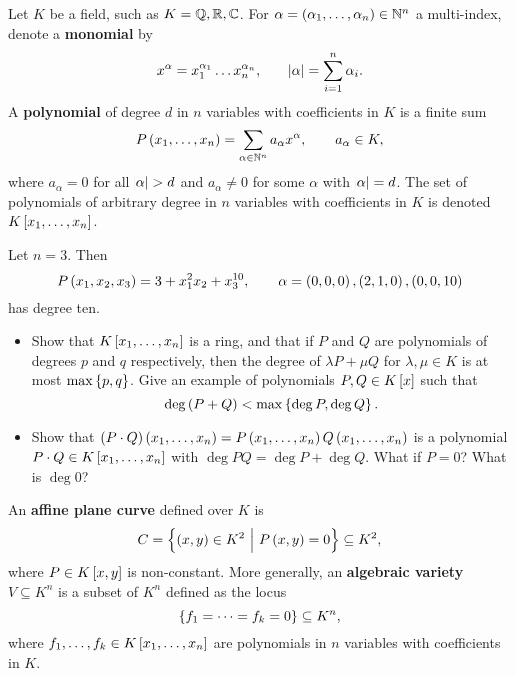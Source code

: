 \pagebreak

\begin{definition}
Let $ K $ be a field, such as $ K = \mathbb{Q}, \mathbb{R}, \mathbb{C} $. For $ \alpha = \br{\alpha_1, \dots, \alpha_n} \in \NN^n $ a multi-index, denote a \textbf{monomial} by
$$ x^\alpha = x_1^{\alpha_1} \dots x_n^{\alpha_n}, \qquad \abs{\alpha} = \sum_{i = 1}^n \alpha_i. $$
A \textbf{polynomial} of degree $ d $ in $ n $ variables with coefficients in $ K $ is a finite sum
$$ P\br{x_1, \dots, x_n} = \sum_{\alpha \in \NN^n} a_\alpha x^\alpha, \qquad a_\alpha \in K, $$
where $ a_\alpha = 0 $ for all $ \abs{\alpha} > d $ and $ a_\alpha \ne 0 $ for some $ \alpha $ with $ \abs{\alpha} = d $. The set of polynomials of arbitrary degree in $ n $ variables with coefficients in $ K $ is denoted $ K\sbr{x_1, \dots, x_n} $.
\end{definition}

\begin{example*}
Let $ n = 3 $. Then
$$ P\br{x_1, x_2, x_3} = 3 + x_1^2x_2 + x_3^{10}, \qquad \alpha = \br{0, 0, 0}, \br{2, 1, 0}, \br{0, 0, 10} $$
has degree ten.
\end{example*}

\begin{exercise**}
\hfill
\begin{itemize}
\item Show that $ K\sbr{x_1, \dots, x_n} $ is a ring, and that if $ P $ and $ Q $ are polynomials of degrees $ p $ and $ q $ respectively, then the degree of $ \lambda P + \mu Q $ for $ \lambda, \mu \in K $ is at most $ \max\cbr{p, q} $. Give an example of polynomials $ P, Q \in K\sbr{x} $ such that
$$ \deg \br{P + Q} < \max\cbr{\deg P, \deg Q}. $$
\item Show that $ \br{P \cdot Q}\br{x_1, \dots, x_n} = P\br{x_1, \dots, x_n}Q\br{x_1, \dots, x_n} $ is a polynomial $ P \cdot Q \in K\sbr{x_1, \dots, x_n} $ with $ \deg PQ = \deg P + \deg Q $. What if $ P = 0 $? What is $ \deg 0 $?
\end{itemize}
\end{exercise**}

\begin{definition}
An \textbf{affine plane curve} defined over $ K $ is
$$ C = \cbr{\br{x, y} \in K^2 \st P\br{x, y} = 0} \subseteq K^2, $$
where $ P \in K\sbr{x, y} $ is non-constant. More generally, an \textbf{algebraic variety} $ V \subseteq K^n $ is a subset of $ K^n $ defined as the locus
$$ \cbr{f_1 = \dots = f_k = 0} \subseteq K^n, $$
where $ f_1, \dots, f_k \in K\sbr{x_1, \dots, x_n} $ are polynomials in $ n $ variables with coefficients in $ K $.
\end{definition}

